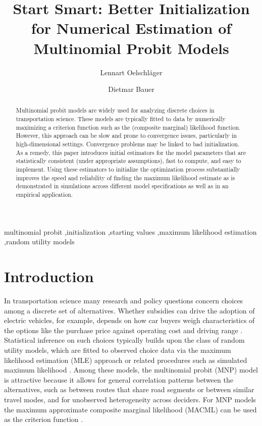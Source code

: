 \documentclass[preprint,12pt,authoryear]{elsarticle}
\begin{document}
\begin{frontmatter}

\title{Start Smart: Better Initialization for Numerical Estimation of Multinomial Probit Models}

\author[a]{Lennart Oelschläger}
\author[a]{Dietmar Bauer}

\begin{abstract}
Multinomial probit models are widely used for analyzing discrete choices in transportation science. These models are typically fitted to data by
numerically maximizing a criterion function such as the (composite marginal) likelihood function. However, this approach can be slow and prone to convergence issues, particularly in high-dimensional settings. Convergence problems may be linked to bad initialization. As a remedy, this paper introduces initial estimators for the model parameters that are statistically consistent (under appropriate assumptions), fast to compute, and easy to implement. Using these estimators to initialize the optimization process substantially improves the speed and reliability of finding the maximum likelihood estimate as is demonstrated in simulations across different model specifications as well as in an empirical application.
\end{abstract}

\begin{keyword}
multinomial probit \sep initialization \sep starting values \sep maximum likelihood estimation \sep random utility models
\end{keyword}

\end{frontmatter}

\section{Introduction}\label{sec:introduction}

In transportation science many research and policy questions concern choices among a discrete set of alternatives. Whether subsidies can drive the adoption of electric vehicles, for example, depends on how car buyers weigh characteristics of the options like the purchase price against operating cost and driving range \citep{Helveston2015}. Statistical inference on such choices typically builds upon the class of random utility models, which are fitted to observed choice data via the maximum likelihood estimation (MLE) approach or related procedures such as simulated maximum likelihood \citep[see, for example,][]{Train2009}. Among these models, the multinomial probit (MNP) model is attractive because it allows for general correlation patterns between the alternatives, such as between routes that share road segments or between similar travel modes, and for unobserved heterogeneity across deciders.
 For MNP models the maximum approximate composite marginal likelihood (MACML) can be used as the criterion function \citep[see][]{Bhat2011}.
\end{document}
